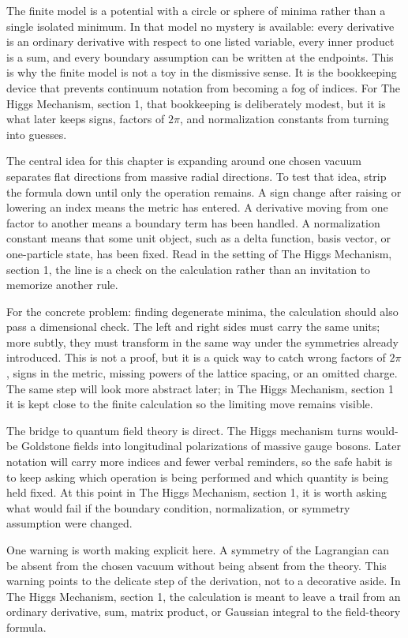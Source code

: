 The finite model is a potential with a circle or sphere of minima rather than a single isolated minimum.  In that model no mystery is available: every derivative is an ordinary derivative with respect to one listed variable, every inner product is a sum, and every boundary assumption can be written at the endpoints.  This is why the finite model is not a toy in the dismissive sense.  It is the bookkeeping device that prevents continuum notation from becoming a fog of indices.  For The Higgs Mechanism, section 1, that bookkeeping is deliberately modest, but it is what later keeps signs, factors of \(2\pi\), and normalization constants from turning into guesses.

The central idea for this chapter is expanding around one chosen vacuum separates flat directions from massive radial directions.  To test that idea, strip the formula down until only the operation remains.  A sign change after raising or lowering an index means the metric has entered.  A derivative moving from one factor to another means a boundary term has been handled.  A normalization constant means that some unit object, such as a delta function, basis vector, or one-particle state, has been fixed.  Read in the setting of The Higgs Mechanism, section 1, the line is a check on the calculation rather than an invitation to memorize another rule.

For the concrete problem: finding degenerate minima, the calculation should also pass a dimensional check.  The left and right sides must carry the same units; more subtly, they must transform in the same way under the symmetries already introduced.  This is not a proof, but it is a quick way to catch wrong factors of \(2\pi\), signs in the metric, missing powers of the lattice spacing, or an omitted charge.  The same step will look more abstract later; in The Higgs Mechanism, section 1 it is kept close to the finite calculation so the limiting move remains visible.

The bridge to quantum field theory is direct.  The Higgs mechanism turns would-be Goldstone fields into longitudinal polarizations of massive gauge bosons.  Later notation will carry more indices and fewer verbal reminders, so the safe habit is to keep asking which operation is being performed and which quantity is being held fixed.  At this point in The Higgs Mechanism, section 1, it is worth asking what would fail if the boundary condition, normalization, or symmetry assumption were changed.

One warning is worth making explicit here.  A symmetry of the Lagrangian can be absent from the chosen vacuum without being absent from the theory.  This warning points to the delicate step of the derivation, not to a decorative aside.  In The Higgs Mechanism, section 1, the calculation is meant to leave a trail from an ordinary derivative, sum, matrix product, or Gaussian integral to the field-theory formula.

